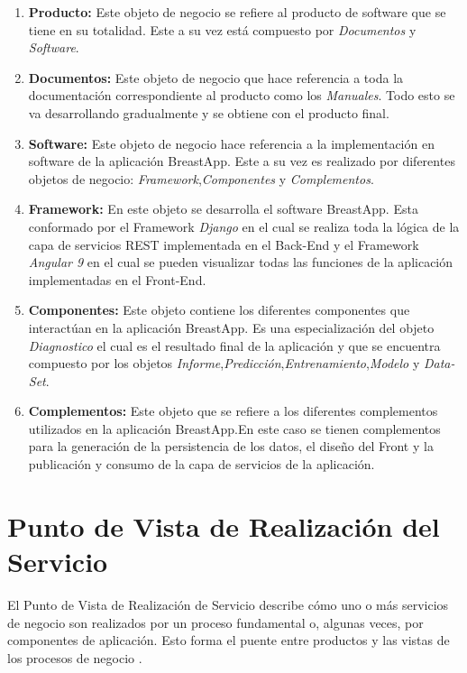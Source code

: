 \begin{enumerate}[label=\textbf{\arabic*})]
	
\item  \textbf{Producto:} Este objeto de negocio se refiere al producto de software que se tiene en su totalidad. Este a su vez está compuesto por \textit{Documentos} y \textit{Software}.

\item  \textbf{Documentos:} Este objeto de negocio que hace referencia a toda la documentación correspondiente al producto como los \textit{Manuales}. Todo esto se va desarrollando gradualmente y se obtiene con el producto final.

\item  \textbf{Software:} Este objeto de negocio hace referencia a la implementación en software de la aplicación BreastApp. Este a su vez es realizado por diferentes objetos de negocio: \textit{Framework},\textit{Componentes} y \textit{Complementos}.

\item  \textbf{Framework:} En este objeto se desarrolla el software BreastApp. Esta conformado por el Framework \textit{Django} en el cual se realiza toda la lógica de la capa de servicios REST implementada en el Back-End y el Framework \textit{Angular 9} en el cual se pueden visualizar todas las funciones de la aplicación implementadas en el Front-End.

\item  \textbf{Componentes:} Este objeto contiene los diferentes componentes que interactúan en la aplicación BreastApp. Es una especialización del objeto \textit{Diagnostico} el cual es el resultado final de la aplicación y que se encuentra compuesto por los objetos \textit{Informe},\textit{Predicción},\textit{Entrenamiento},\textit{Modelo} y \textit{Data-Set}.

\item  \textbf{Complementos:} Este objeto que se refiere a los diferentes complementos utilizados en la aplicación BreastApp.En este caso se tienen complementos para la generación  de la persistencia de los datos, el diseño del Front y la publicación y consumo de la capa de servicios de la aplicación.
\end{enumerate}

\newpage
\section{Punto de Vista de Realización del Servicio}
El Punto de Vista de Realización de Servicio describe cómo uno o más servicios de negocio son realizados por un proceso fundamental o, algunas veces, por componentes de aplicación. Esto forma el puente entre productos  y las vistas de los procesos de negocio \cite{BolanosCastro2019}.


